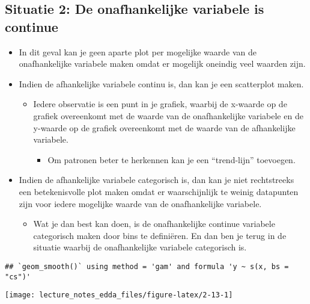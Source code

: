 \documentclass[]{memoir}
\providecommand{\tightlist}{%
  \setlength{\itemsep}{0pt}\setlength{\parskip}{0pt}}
\begin{document}
\subsection{Situatie 2: De onafhankelijke variabele is
continue}\label{situatie-2-de-onafhankelijke-variabele-is-continue}

\begin{itemize}
\tightlist
\item
  In dit geval kan je geen aparte plot per mogelijke waarde van de
  onafhankelijke variabele maken omdat er mogelijk oneindig veel waarden
  zijn.
\item
  Indien de afhankelijke variabele continu is, dan kan je een
  scatterplot maken.

  \begin{itemize}
  \tightlist
  \item
    Iedere observatie is een punt in je grafiek, waarbij de x-waarde op
    de grafiek overeenkomt met de waarde van de onafhankelijke variabele
    en de y-waarde op de grafiek overeenkomt met de waarde van de
    afhankelijke variabele.

    \begin{itemize}
    \tightlist
    \item
      Om patronen beter te herkennen kan je een ``trend-lijn''
      toevoegen.
    \end{itemize}
  \end{itemize}
\item
  Indien de afhankelijke variabele categorisch is, dan kan je niet
  rechtstreeks een betekenisvolle plot maken omdat er waarschijnlijk te
  weinig datapunten zijn voor iedere mogelijke waarde van de
  onafhankelijke variabele.

  \begin{itemize}
  \tightlist
  \item
    Wat je dan best kan doen, is de onafhankelijke continue variabele
    categorisch maken door bins te definiëren. En dan ben je terug in de
    situatie waarbij de onafhankelijke variabele categorisch is.
  \end{itemize}
\end{itemize}

\begin{verbatim}
## `geom_smooth()` using method = 'gam' and formula 'y ~ s(x, bs = "cs")'
\end{verbatim}

\texttt{[image: lecture\_notes\_edda\_files/figure-latex/2-13-1]}
\end{document}
